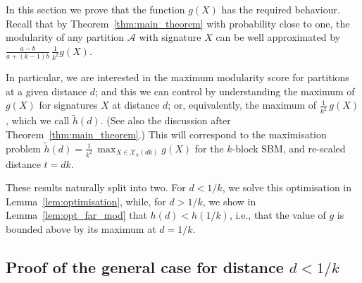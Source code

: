 \documentclass[a4paper,UKenglish,cleveref, autoref, thm-restate,numberwithinsect]{lipics-v2021}
\newcommand{\cA}{\mathcal{A}}
\begin{document}
In this section we prove that the function $g(X)$ has the required behaviour. Recall that by Theorem~\ref{thm:main_theorem} with probability close to one, the modularity of any partition $\cA$ with signature $X$ can be well approximated by $\frac{a-b}{a+(k-1)b}\,\frac{1}{k^2}g(X)$. 

In particular, we are interested in the maximum modularity score for partitions at a given distance $d$; and this we can control by understanding the maximum of $g(X)$ for signatures $X$ at distance $d$; or, equivalently, the maximum of $\frac{1}{k^2}\,g(X)$, which we call $\tilde{h}(d)$. (See also the discussion after Theorem~\ref{thm:main_theorem}.) This will correspond to the maximisation problem $\tilde{h}(d)=\frac{1}{k^2}\,\max_{X \in \mathcal{X}_k(dk)} g(X)$ for the $k$-block SBM, and re-scaled distance $t=dk$.

These results naturally split into two. For $d<1/k$, we solve this optimisation in Lemma~\ref{lem:optimisation}, while, for $d>1/k$, we show in Lemma~\ref{lem:opt_far_mod} that $h(d)<h(1/k)$, i.e., that the value of $g$ is bounded above by its maximum at $d=1/k$. 



\subsection{Proof of the general case for distance $d<1/k$}
\label{app:optimisation-lemma}
\end{document}
